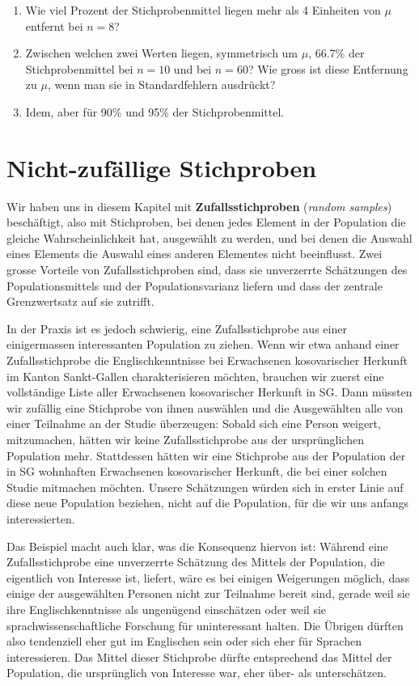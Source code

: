 \documentclass[oneside, 10pt]{book}\usepackage[]{graphicx}\usepackage[]{xcolor}
\begin{document}
\begin{enumerate}
\begin{enumerate}
\item Wie viel Prozent der Stichprobenmittel liegen mehr als
4 Einheiten von $\mu$ entfernt bei $n = 8$?

\item Zwischen welchen zwei Werten liegen, symmetrisch um $\mu$,
66.7\% der Stichprobenmittel bei $n = 10$ und bei $n = 60$?
Wie gross ist diese Entfernung zu $\mu$, wenn man sie in Standardfehlern ausdrückt?

\item Idem, aber für 90\% und 95\% der Stichprobenmittel.
\end{enumerate}
\end{enumerate}

\section{Nicht-zufällige Stichproben}
Wir haben uns in diesem Kapitel mit \textbf{Zufallsstichproben}
(\textit{random samples}) beschäftigt,
also mit Stichproben, bei denen jedes Element in der Population
die gleiche Wahrscheinlichkeit hat, ausgewählt zu werden, und bei
denen die Auswahl eines Elements die Auswahl eines anderen Elementes
nicht beeinflusst.
Zwei grosse Vorteile von Zufallsstichproben sind,
dass sie unverzerrte Schätzungen des Populationsmittels und der
Populationsvarianz liefern und dass der zentrale Grenzwertsatz
auf sie zutrifft.

In der Praxis ist es jedoch schwierig, eine Zufallsstichprobe
aus einer einigermassen interessanten Population zu ziehen.
Wenn wir etwa anhand einer Zufallsstichprobe die Englischkenntnisse
bei Erwachsenen kosovarischer Herkunft im Kanton Sankt-Gallen
charakterisieren möchten, brauchen wir zuerst eine vollständige
Liste aller Erwachsenen kosovarischer Herkunft in SG.
Dann müssten wir zufällig eine Stichprobe von ihnen auswählen
und die Ausgewählten alle von einer Teilnahme an der Studie überzeugen:
Sobald sich eine Person weigert, mitzumachen, hätten wir keine
Zufallsstichprobe aus der ursprünglichen Population mehr.
Stattdessen hätten wir eine Stichprobe aus der Population
der in SG wohnhaften Erwachsenen kosovarischer Herkunft, die
bei einer solchen Studie mitmachen möchten. Unsere Schätzungen
würden sich in erster Linie auf diese neue Population beziehen, nicht
auf die Population, für die wir uns anfangs interessierten.

Das Beispiel macht auch klar, was die Konsequenz hiervon ist:
Während eine Zufallsstichprobe eine unverzerrte Schätzung des
Mittels der Population, die eigentlich von Interesse ist, liefert,
wäre es bei einigen Weigerungen möglich, dass einige der ausgewählten
Personen nicht zur Teilnahme bereit sind, gerade weil sie ihre
Englischkenntnisse als ungenügend einschätzen oder weil sie
sprachwissenschaftliche Forschung für uninteressant halten.
Die Übrigen dürften also tendenziell eher gut im Englischen sein
oder sich eher für Sprachen interessieren.
Das Mittel dieser Stichprobe dürfte entsprechend das
Mittel der Population, die ursprünglich von Interesse war,
eher über- als unterschätzen.
\end{document}
